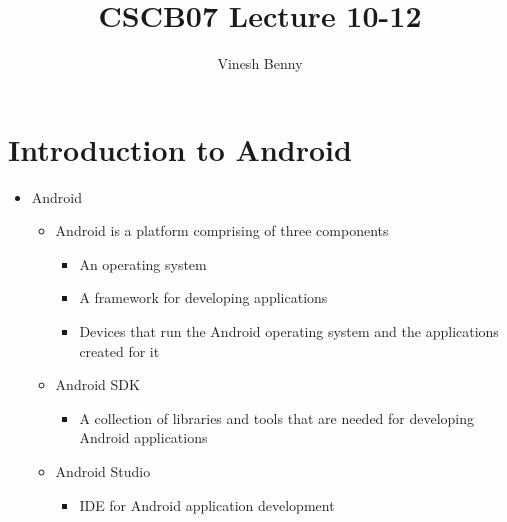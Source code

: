 \documentclass[11pt]{article}
\title{CSCB07 Lecture 10-12}
\author{Vinesh Benny}
\begin{document}
\section{Introduction to Android}
\begin{itemize}
	\item Android
		\begin{itemize}
			\item Android is a platform comprising of three components
				\begin{itemize}
					\item An operating system
					\item A framework for developing applications
					\item Devices that run the Android operating system and the applications created
					for it
				\end{itemize}
			\item Android SDK
				\begin{itemize}
					\item A collection of libraries and tools that are needed for developing Android applications
				\end{itemize}
			\item Android Studio
				\begin{itemize}
					\item IDE for Android application development
				\end{itemize}
		\end{itemize}


\end{itemize}
\end{document}
